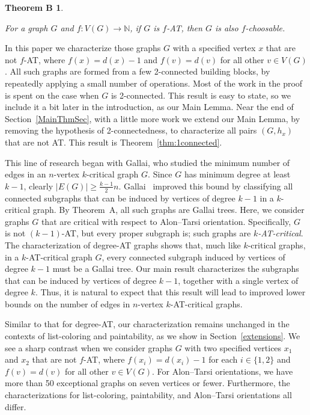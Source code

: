 \documentclass[12pt]{article}
\theoremstyle{plain}
\newtheorem*{thmB}{Theorem B}
\theoremstyle{definition}
\theoremstyle{remark}
\newcommand{\IN}{\mathbb{N}}
\newcommand{\func}[3]{#1\colon #2 \rightarrow #3}
\begin{document}
	\begin{thmB}
				\hypertarget{target:thmB}{}
		For a graph $G$ and $\func{f}{V(G)}{\IN}$,
		if $G$ is $f$-AT, then $G$ is also $f$-choosable.
	\end{thmB}
	
	In this paper we characterize those graphs $G$ with a specified vertex $x$
	that are not $f$-AT, where $f(x)=d(x)-1$ and $f(v)=d(v)$ for all other $v\in
	V(G)$.  All such graphs are formed from a few 2-connected building blocks, by
	repeatedly applying a small number of operations.  
	Most of the work in the proof is spent on the case when $G$ is 2-connected.
	This result is easy to state, so we include it a bit later in the introduction,
	as our Main Lemma.
	Near the end of Section~\ref{MainThmSec}, with a little more work we extend our
	Main Lemma, by removing the hypothesis of 2-connectedness, to characterize
	all pairs $(G,h_x)$ that are not AT.  This result is
	Theorem~\ref{thm:1connected}.
	
	This line of research began with Gallai, who studied the minimum number of edges
	in an $n$-vertex $k$-critical graph $G$.  Since $G$ has minimum degree at least
	$k-1$, clearly $|E(G)|\ge\frac{k-1}2n$.  Gallai~\cite{gallai1963kritische} improved this
	bound by classifying all connected subgraphs that can be induced by vertices of
	degree $k-1$ in a $k$-critical graph.  By Theorem~A, all such graphs are Gallai
	trees.  Here, we consider graphs $G$ that are critical with respect to Alon--Tarsi
	orientation.  Specifically, $G$ is not $(k-1)$-AT, but every proper subgraph is;
	such graphs are \emph{$k$-AT-critical}.  The characterization of degree-AT
	graphs shows that, much like $k$-critical graphs, in a $k$-AT-critical graph
	$G$, every connected subgraph induced by vertices of degree $k-1$ must be a
	Gallai tree.  Our main result characterizes the subgraphs that can be induced by
	vertices of degree $k-1$, together with a single vertex of degree $k$.  Thus, it
	is natural to expect that this result will lead to improved lower bounds on
	the number of edges in $n$-vertex $k$-AT-critical graphs.
	
	Similar to that for
	degree-AT, our characterization remains unchanged in the contexts of
	list-coloring and paintability, as we show in Section~\ref{extensions}.  We
	see a sharp contrast when we consider
	graphs $G$ with two specified vertices $x_1$ and $x_2$ that are not $f$-AT,
	where $f(x_i)=d(x_i)-1$ for each $i\in \{1,2\}$ and $f(v)=d(v)$ for all other
	$v\in V(G)$.  For Alon--Tarsi orientations, we have more than 50 exceptional
	graphs on seven vertices or fewer.  Furthermore, the characterizations for
	list-coloring, paintability, and Alon--Tarsi orientations all differ.
	
\end{document}
